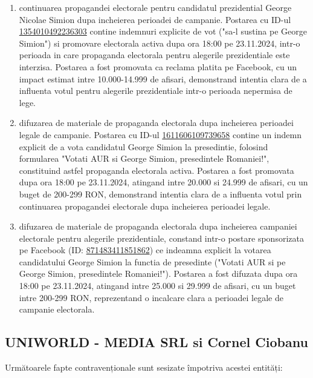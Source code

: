 \documentclass[a4paper,12pt]{article}
\begin{document}
\begin{enumerate}[leftmargin=*, label=\arabic*.)]
    \item continuarea propagandei electorale pentru candidatul prezidential George Nicolae Simion dupa incheierea perioadei de campanie. Postarea cu ID-ul \href{https://www.facebook.com/ads/library/?id=1354010492236303}{1354010492236303} contine indemnuri explicite de vot ("sa-l sustina pe George Simion") si promovare electorala activa dupa ora 18:00 pe 23.11.2024, intr-o perioada in care propaganda electorala pentru alegerile prezidentiale este interzisa. Postarea a fost promovata ca reclama platita pe Facebook, cu un impact estimat intre 10.000-14.999 de afisari, demonstrand intentia clara de a influenta votul pentru alegerile prezidentiale intr-o perioada nepermisa de lege.
    \item difuzarea de materiale de propaganda electorala dupa incheierea perioadei legale de campanie. Postarea cu ID-ul \href{https://www.facebook.com/ads/library/?id=1611606109739658}{1611606109739658} contine un indemn explicit de a vota candidatul George Simion la presedintie, folosind formularea "Votati AUR si George Simion, presedintele Romaniei!", constituind astfel propaganda electorala activa. Postarea a fost promovata dupa ora 18:00 pe 23.11.2024, atingand intre 20.000 si 24.999 de afisari, cu un buget de 200-299 RON, demonstrand intentia clara de a influenta votul prin continuarea propagandei electorale dupa incheierea perioadei legale.
    \item difuzarea de materiale de propaganda electorala dupa incheierea campaniei electorale pentru alegerile prezidentiale, constand intr-o postare sponsorizata pe Facebook (ID: \href{https://www.facebook.com/ads/library/?id=871483411851862}{871483411851862}) ce indeamna explicit la votarea candidatului George Simion la functia de presedinte ("Votati AUR si pe George Simion, presedintele Romaniei!"). Postarea a fost difuzata dupa ora 18:00 pe 23.11.2024, atingand intre 25.000 si 29.999 de afisari, cu un buget intre 200-299 RON, reprezentand o incalcare clara a perioadei legale de campanie electorala.
\end{enumerate}

\vspace{0.5cm}

\subsection{UNIWORLD - MEDIA SRL si Cornel Ciobanu}
Următoarele fapte contravenționale sunt sesizate împotriva acestei entități:
\end{document}
